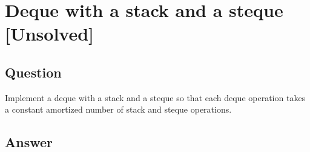 \section{Deque with a stack and a steque [Unsolved]}

\subsection*{Question}
Implement a deque with a stack and a steque
so that each deque operation takes a constant amortized number
of stack and steque operations.

\subsection*{Answer}
